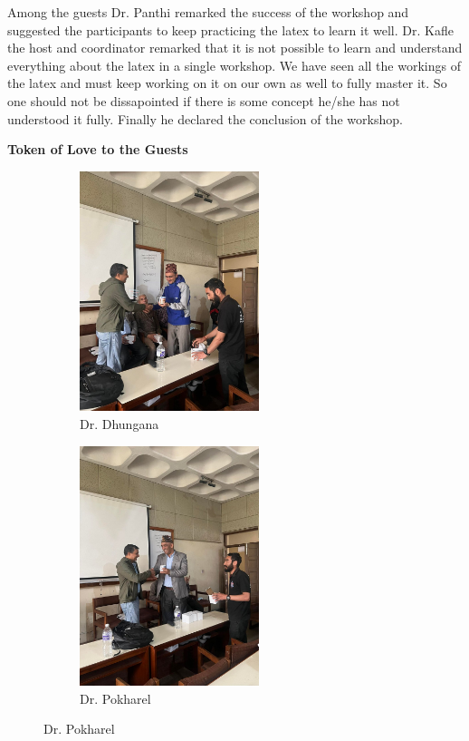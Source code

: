 \documentclass[a4paper,12pt]{report}
\begin{document}
\vspace{7mm}
Among the guests Dr. Panthi remarked the success of the workshop and suggested the participants to keep practicing the latex to learn it well. Dr. Kafle the host and coordinator remarked that it is not possible to learn and understand everything about the latex in a single workshop. We have seen all the workings of the latex and must keep working on it on our own as well to fully master it. So one should not be dissapointed if there is some concept he/she has not understood it fully. Finally he declared the conclusion of the workshop.
\clearpage

\vspace*{5mm}
{\bfseries \large Token of Love to the Guests}
\vspace{3mm}
\begin{figure}[h!]
\centering
\begin{subfigure}[c]{0.33\textwidth}
  \includegraphics[height=7cm, width=\textwidth]{rcdt.jpg}
  \caption{Dr. Dhungana}
\end{subfigure}
\hfill
\begin{subfigure}[t]{0.33\textwidth}
  \includegraphics[height=7cm, width=\textwidth]{puskart.jpg}
  \caption{Dr. Pokharel}

\end{subfigure}
\end{figure}
\end{document}
